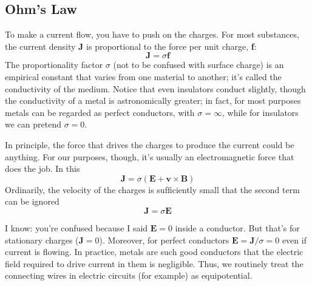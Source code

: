 \documentclass[../../../main.tex]{subfiles}
\begin{document}
\subsection{Ohm's Law}
To make a current ﬂow, you have to push on the charges. For most substances, the current density \textbf{J} is proportional to the force per unit charge, \textbf{f}:
\begin{equation*}
    \mathbf{J} = \sigma \mathbf{f}
\end{equation*}
The proportionality factor $\sigma$ (not to be confused with surface charge) is an empirical constant that varies from one material to another; it's called the conductivity of the medium.  Notice that even insulators conduct slightly, though the conductivity of a metal is astronomically greater; in fact, for most purposes metals can be regarded as perfect conductors, with $\sigma = \infty$, while for insulators 
we can pretend $\sigma = 0$.

In principle, the force that drives the charges to produce the current could be anything. For our purposes, though, it's usually an electromagnetic force that does the job. In this
\begin{equation*}
    \mathbf{J} = \sigma(\mathbf{E}+\mathbf{v}\times \mathbf{B})
\end{equation*}
Ordinarily, the velocity of the charges is sufﬁciently small that the second term can be ignored
\begin{equation*}
    \mathbf{J} = \sigma\mathbf{E}
\end{equation*}

I know: you're confused because I said $\mathbf{E} = 0$ inside a conductor. But that's for stationary charges ($\mathbf{J} = 0$). Moreover, for perfect conductors $\mathbf{E} = \mathbf{J}/\sigma = 0$ even if current is ﬂowing. In practice, metals are such good conductors that the electric ﬁeld required to drive current in them is negligible. Thus, we routinely treat the connecting wires in electric circuits (for example) as equipotential.
\end{document}
